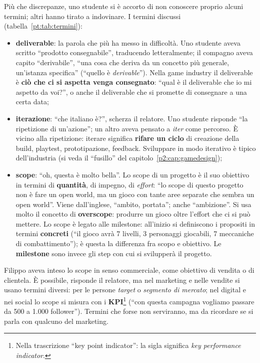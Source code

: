 Più che discrepanze, uno studente si è accorto di non conoscere proprio alcuni
termini; altri hanno tirato a indovinare. I termini discussi
(tabella~\ref{pt:tab:termini}):
\begin{itemize}
  \item \textbf{deliverable}: la parola che più ha messo in difficoltà. Uno
        studente aveva scritto ``prodotto consegnabile'', traducendo
        letteralmente; il compagno aveva capito ``derivabile'', ``una cosa che
        deriva da un concetto più generale, un'istanza specifica'' (``quello è
        \emph{derivable}''). Nella game industry il deliverable è \textbf{ciò
        che ci si aspetta venga consegnato}: ``qual è il deliverable che io mi
        aspetto da voi?'', o anche il deliverable che si promette di consegnare
        a una certa data;
  \item \textbf{iterazione}: ``che italiano è?'', scherza il relatore. Uno
        studente risponde ``la ripetizione di un'azione''; un altro aveva
        pensato a \emph{iter} come percorso. È vicino alla ripetizione:
        iterare significa \textbf{rifare un ciclo} di creazione della build,
        playtest, prototipazione, feedback. Sviluppare in modo iterativo è
        tipico dell'industria (si veda il ``fusillo'' del
        capitolo~\ref{p2:cap:gamedesign});
  \item \textbf{scope}: ``oh, questa è molto bella''. Lo scope di un progetto è
        il suo obiettivo in termini di \textbf{quantità}, di impegno, di
        \emph{effort}: ``lo scope di questo progetto non è fare un open world,
        ma un gioco con tante aree separate che sembra un open world''. Viene
        dall'inglese, ``ambito, portata''; anche ``ambizione''. Si usa molto il
        concetto di \textbf{overscope}: produrre un gioco oltre l'effort che ci
        si può mettere. Lo scope è legato alle milestone: all'inizio si
        definiscono i propositi in termini \textbf{concreti} (``il gioco avrà 7
        livelli, 3 personaggi giocabili, 7 meccaniche di combattimento''); è
        questa la differenza fra scopo e obiettivo. Le \textbf{milestone} sono
        invece gli step con cui si svilupperà il progetto.
\end{itemize}
Filippo aveva inteso lo scope in senso commerciale, come obiettivo di vendita o
di clientela. È possibile, risponde il relatore, ma nel marketing e nelle
vendite si usano termini diversi: per le persone \emph{target} o
\emph{segmento di mercato}; nel digital e nei social lo scope si misura con i
\textbf{KPI}\footnote{Nella trascrizione ``key point indicator'': la sigla
significa \emph{key performance indicator}.} (``con questa campagna vogliamo
passare da 500 a 1.000 follower''). Termini che forse non serviranno, ma da
ricordare se si parla con qualcuno del marketing.

